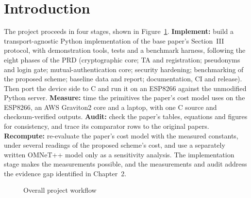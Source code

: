 \documentclass[12pt,a4paper,oneside]{report}
\numberwithin{equation}{chapter}
\begin{document}
\section{Introduction}
The project proceeds in four stages, shown in Figure~\ref{fig:workflow}. \textbf{Implement:} build a transport-agnostic Python implementation of the base paper's Section~III protocol, with demonstration tools, tests and a benchmark harness, following the eight phases of the PRD (cryptographic core; TA and registration; pseudonyms and login gate; mutual-authentication core; security hardening; benchmarking of the proposed scheme; baseline data and report; documentation, CI and release). Then port the device side to C and run it on an ESP8266 against the unmodified Python server. \textbf{Measure:} time the primitives the paper's cost model uses on the ESP8266, an AWS Graviton2 core and a laptop, with one C source and checksum-verified outputs. \textbf{Audit:} check the paper's tables, equations and figures for consistency, and trace its comparator rows to the original papers. \textbf{Recompute:} re-evaluate the paper's cost model with the measured constants, under several readings of the proposed scheme's cost, and use a separately written OMNeT++ model only as a sensitivity analysis. The implementation stage makes the measurements possible, and the measurements and audit address the evidence gap identified in Chapter~2.

\begin{figure}[H]
\centering
{}
\caption{Overall project workflow}
\label{fig:workflow}
\end{figure}
\end{document}
